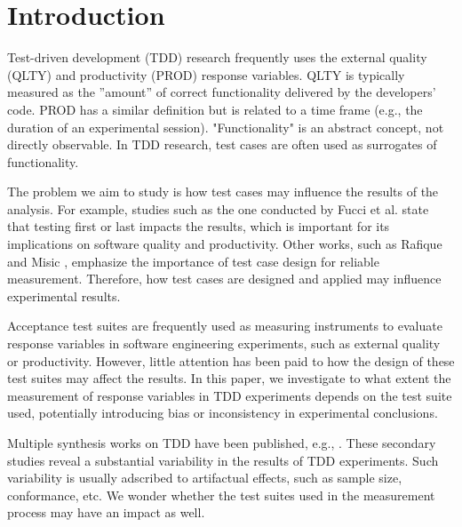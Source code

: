 \section{Introduction}\label{sec:introduction}

Test-driven development (TDD) research frequently uses the external quality (QLTY) and productivity (PROD) response variables. QLTY is typically measured as the ''amount'' of correct functionality delivered by the developers' code. PROD has a similar definition but is related to a time frame (e.g., the duration of an experimental session). "Functionality" is an abstract concept, not directly observable. In TDD research, test cases are often used as surrogates of functionality.

The problem we aim to study is how test cases may influence the results of the analysis. For example, studies such as the one conducted by Fucci et al. \cite{Fucci.2017} state that testing first or last impacts the results, which is important for its implications on software quality and productivity. Other works, such as Rafique and Misic \cite{Rafique.2013}, emphasize the importance of test case design for reliable measurement. Therefore, how test cases are designed and applied may influence experimental results.

Acceptance test suites are frequently used as measuring instruments to evaluate response variables in software engineering experiments, such as external quality or productivity. However, little attention has been paid to how the design of these test suites may affect the results. In this paper, we investigate to what extent the measurement of response variables in TDD experiments depends on the test suite used, potentially introducing bias or inconsistency in experimental conclusions.


Multiple synthesis works on TDD have been published, e.g., \cite{Rafique2013,Munir,Bissi2016,Causevic2011,Turhan-2010-How-EI-TDD,Kollanus-2010-TDD-promising-approach,Makinen-2014-Effects-TDD,Desai-2008-Survey-Evidence-TDD,Hammond-2012-TDD-State-Practice,Ghafari-2020-WhY-Research-TDD-Inconclusive,Sfetsos-2010-Empirical-Studies-Quality-Agile-SLR,Yahya-2014-TDD-contribution-universities,Jones-2004-TDD-Goes-School,Karac-2018-What-Do-We-Really-Know-TDD}. These secondary studies reveal a substantial variability in the results of TDD experiments. Such variability is usually adscribed to artifactual effects, such as sample size, conformance, etc. We wonder whether the test suites used in the measurement process may have an impact as well.

